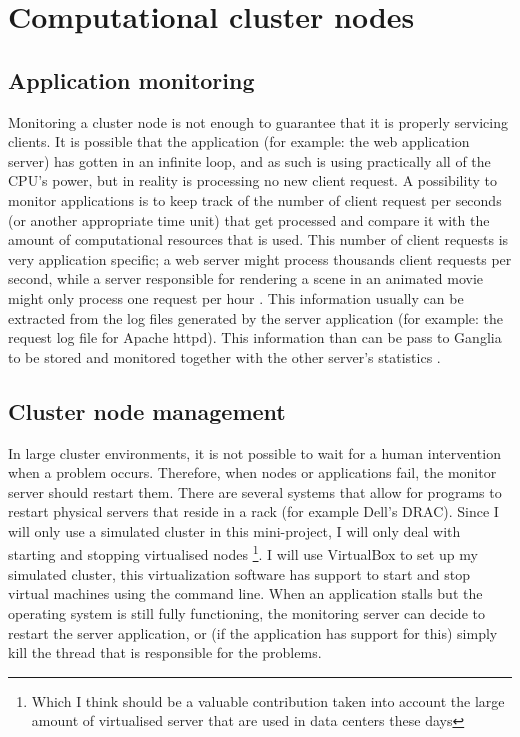 \documentclass[12pt]{report}
\begin{document}
\section{Computational cluster nodes}
\subsection{Application monitoring}
Monitoring a cluster node is not enough to guarantee that it is
properly servicing clients. It is possible that the application (for
example: the web application server) has gotten in an infinite loop,
and as such is using practically all of the CPU's power, but in reality is
processing no new client request.
A possibility to monitor applications is to keep track of the number of
client request per seconds (or another appropriate time unit) that get
processed and compare it with the amount of computational resources
that is used.
This number of client requests is very application specific; a web
server might process thousands client requests per second, while a
server responsible for rendering a scene in an animated movie might only process
one request per hour \cite{apm:2013}.
This information usually can be extracted from the log files generated
by the server application (for example: the request log file for
Apache httpd). This information than can be pass to Ganglia to be
stored and monitored together with the other server's statistics
\cite{ganglia:2013}.

\subsection{Cluster node management}
In large cluster environments, it is not possible to wait for
a human intervention when a problem occurs. Therefore, when nodes or
applications fail, the monitor server should restart them.
There are several systems that allow for programs to restart
physical servers that reside in a rack (for example Dell's DRAC).
Since I will only use a simulated cluster in this mini-project, I will
only deal with starting and stopping virtualised nodes \footnote{Which I think should
be a valuable contribution taken into account the large amount of
virtualised server that are used in data centers these days}.
I will use VirtualBox to set up my simulated cluster, this
virtualization software has support to start and stop virtual machines
using the command line.
When an application stalls but the operating system is still fully
functioning, the monitoring server can decide to restart the server application, or
(if the application has support for this) simply kill the thread that
is responsible for the problems.
\end{document}
